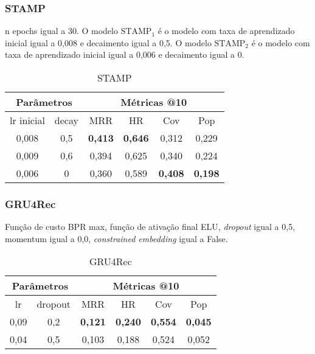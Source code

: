 \subsubsection{STAMP}

n epochs igual a 30. O modelo $\text{STAMP}_{1}$ é o modelo com taxa de
aprendizado inicial igual a 0,008 e decaimento igual a 0,5. O modelo $\text{STAMP}_{2}$
é o modelo com taxa de aprendizado inicial igual a 0,006 e decaimento igual a 0.

\begin{table}[htbp]
  \centering
  \begin{tabular}{|c|c|c|c|c|c|}
    \hline
      \multicolumn{2}{|c|}{Parâmetros} & \multicolumn{4}{c|}{Métricas @10} \\
      \hline
      lr inicial & decay & MRR & HR & Cov & Pop \\
      \hline
      0,008 & 0,5 & \textbf{0,413} & \textbf{0,646} & 0,312 & 0,229 \\
      \hline
      0,009 & 0,6 & 0,394 & 0,625 & 0,340 & 0,224 \\
      \hline
      0,006 & 0 & 0,360 & 0,589 & \textbf{0,408} & \textbf{0,198} \\
      \hline
    \end{tabular}
    \caption{STAMP}
\end{table}


\subsubsection{GRU4Rec}


Função de custo BPR max, função de ativação final ELU, \textit{dropout} igual a 0,5,
momentum igual a 0,0, \textit{constrained embedding} igual a False.
\begin{table}[htbp]
  \centering
  \begin{tabular}{|c|c|c|c|c|c|}
    \hline
      \multicolumn{2}{|c|}{Parâmetros} & \multicolumn{4}{c|}{Métricas @10} \\
      \hline
      lr  & dropout & MRR & HR & Cov & Pop \\
      \hline
      0,09  & 0,2 & \textbf{0,121} & \textbf{0,240} & \textbf{0,554} & \textbf{0,045} \\
      \hline
      0,04  & 0,5 & 0,103 & 0,188 & 0,524 & 0,052 \\
      \hline
    \end{tabular}
    \caption{GRU4Rec}
\end{table}


